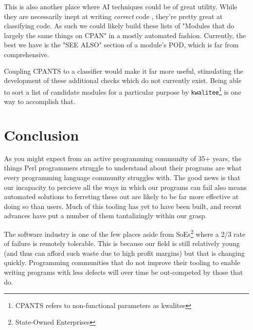\documentclass{article}
\begin{document}
This is also another place where AI techniques could be of great utility.
While they are necessarily inept at writing \textit{correct} code \cite{copilot}, they're pretty great at classifying code.
As such we could likely build these lists of "Modules that do largely the same things on CPAN" in a mostly automated fashion.
Currently, the best we have is the "SEE ALSO" section of a module's POD, which is far from comprehensive.

Coupling CPANTS to a classifier would make it far more useful, stimulating the development of these additional checks which do not currently exist.
Being able to sort a list of candidate modules for a particular purpose by \texttt{kwalitee}\footnote{CPANTS refers to non-functional parameters as kwalitee}
is one way to accomplish that.

\newpage
\section{Conclusion}

As you might expect from an active programming community of 35+ years, the things Perl programmers struggle to understand about their programs are what every programming language community struggles with.
The good news is that our incapacity to percieve all the ways in which our programs can fail also means automated solutions to ferreting these out are likely to be far more effective at doing so than users.
Much of this tooling has yet to have been built, and recent advances have put a number of them tantalizingly within our grasp.

The software industry is one of the few places aside from SoEs\footnote{State-Owned Enterprises} where a 2/3 rate of failure \cite{standish} is remotely tolerable.
This is because our field is still relatively young (and thus can afford such waste due to high profit margins) but that is changing quickly.
Programming communities that do not improve their tooling to enable writing programs with less defects will over time be out-competed by those that do.

\newpage


\end{document}
